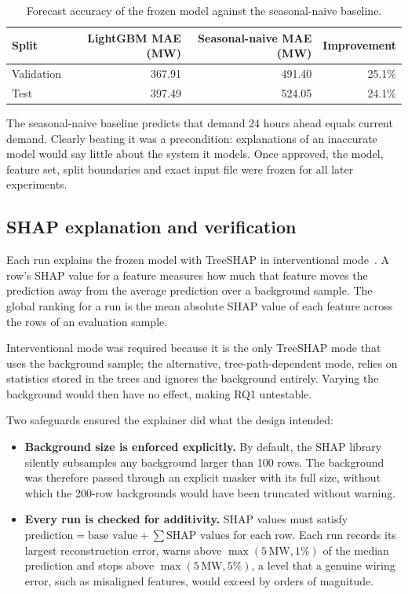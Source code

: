 \documentclass[11pt,a4paper]{article}
\begin{document}
\begin{table}[htbp]
\centering\small
\caption{Forecast accuracy of the frozen model against the seasonal-naive baseline.}
\label{tab:accuracy}
\begin{tabular}{lrrr}
\toprule
Split & LightGBM MAE (MW) & Seasonal-naive MAE (MW) & Improvement \\
\midrule
Validation & 367.91 & 491.40 & 25.1\% \\
Test & 397.49 & 524.05 & 24.1\% \\
\bottomrule
\end{tabular}
\end{table}

The seasonal-naive baseline predicts that demand 24 hours ahead equals current demand. Clearly beating it was a precondition: explanations of an inaccurate model would say little about the system it models. Once approved, the model, feature set, split boundaries and exact input file were frozen for all later experiments.

\subsection{SHAP explanation and verification}\label{sec:shap}

Each run explains the frozen model with TreeSHAP in interventional mode~\cite{lundberg2020}. A row's SHAP value for a feature measures how much that feature moves the prediction away from the average prediction over a background sample. The global ranking for a run is the mean absolute SHAP value of each feature across the rows of an evaluation sample.

Interventional mode was required because it is the only TreeSHAP mode that uses the background sample; the alternative, tree-path-dependent mode, relies on statistics stored in the trees and ignores the background entirely. Varying the background would then have no effect, making RQ1 untestable.

Two safeguards ensured the explainer did what the design intended:
\begin{itemize}
  \item \textbf{Background size is enforced explicitly.} By default, the SHAP library silently subsamples any background larger than 100 rows. The background was therefore passed through an explicit masker with its full size, without which the 200-row backgrounds would have been truncated without warning.
  \item \textbf{Every run is checked for additivity.} SHAP values must satisfy $\text{prediction} = \text{base value} + \sum \text{SHAP values}$ for each row. Each run records its largest reconstruction error, warns above $\max(5\,\text{MW}, 1\%)$ of the median prediction and stops above $\max(5\,\text{MW}, 5\%)$, a level that a genuine wiring error, such as misaligned features, would exceed by orders of magnitude.
\end{itemize}
\end{document}
